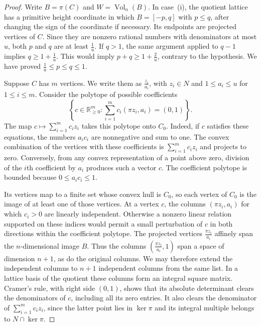\documentclass[reqno, 11pt]{article}
\numberwithin{equation}{section}
\theoremstyle{definition}
\DeclareMathOperator{\Vol}{Vol}
\begin{document}
\begin{proof}
Write $B=\pi(C)$ and $W=\Vol_n(B)$. In case~(i), the quotient
lattice has a primitive height coordinate in which $B=[-p,q]$
with $p\le q$, after changing the sign of the coordinate if necessary.
Its endpoints are projected vertices of $C$. Since they are nonzero
rational numbers with denominators at most $u$, both $p$ and $q$ are
at least $\frac{1}{u}$. If $q>1$, the same argument applied to $q-1$
implies $q\ge1+\frac{1}{u}$. This would imply
$p+q\ge1+\frac{2}{u}$, contrary to the hypothesis. We have proved
$\frac{1}{u}\le p\le q\le1$.

Suppose $C$ has $m$ vertices. We write them as
$\frac{z_i}{a_i}$, with $z_i\in N$ and $1\le a_i\le u$ for
$1\le i\le m$. Consider the polytope of possible coefficients
\[
 \left\{c\in\mathbb R_{\ge0}^{m}:
          \sum_{i=1}^{m}c_i(\pi z_i,a_i)=(0,1)\right\}.
\]
The map $c\mapsto\sum_{i=1}^{m}c_i z_i$ takes this polytope onto $C_0$.
Indeed, if $c$ satisfies these equations, the numbers $a_ic_i$ are
nonnegative and sum to one. The convex combination of the vertices
with these coefficients is $\sum_{i=1}^{m}c_i z_i$ and projects to
zero. Conversely, from any convex representation of a point above zero,
division of the $i$th coefficient by $a_i$ produces such a vector $c$.
The coefficient polytope is bounded because $0\le a_ic_i\le1$.

Its vertices map to a finite set whose convex hull is $C_0$, so
each vertex of $C_0$ is the image of at least one of those vertices.
At a vertex $c$, the columns $(\pi z_i,a_i)$ for which $c_i>0$ are
linearly independent. Otherwise a nonzero linear relation supported
on these indices would permit a small perturbation of $c$ in both
directions within the coefficient polytope. The projected vertices
$\frac{\pi z_i}{a_i}$ affinely span the $n$-dimensional image $B$.
Thus the columns $(\frac{\pi z_i}{a_i},1)$ span a space of dimension
$n+1$, as do the original columns. We may therefore extend the
independent columns to $n+1$ independent columns from the same list.
In a lattice basis of the quotient these columns form an integral
square matrix. Cramer's rule, with right side $(0,1)$, shows that
its absolute determinant clears the denominators of $c$, including
all its zero entries. It also clears the denominator of
$\sum_{i=1}^{m} c_i z_i$, since the latter point lies in $\ker\pi$
and its integral multiple belongs to $N\cap\ker\pi$.


\end{proof}
\end{document}
